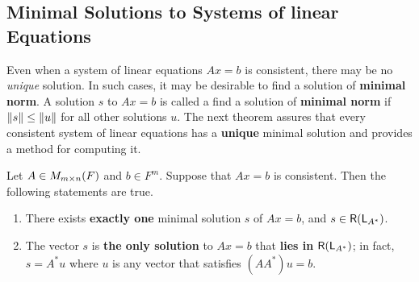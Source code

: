 \subsection{Minimal Solutions to Systems of linear Equations} \label{sec 6.3.2}

Even when a system of linear equations \(Ax = b\) is consistent, there may be no \emph{unique} solution.
In such cases, it may be desirable to find a solution of \textbf{minimal norm}.
A solution \(s\) to \(Ax = b\) is called a find a solution of \textbf{minimal norm} if \(\left\lVert s\right\rVert \le \left\lVert u\right\rVert\) for all other solutions \(u\).
The next theorem assures that every consistent system of linear equations has a \textbf{unique} minimal solution and provides a method for computing it.

\begin{theorem} \label{thm 6.13}
Let \(A \in M_{m \times n}(F)\) and \(b \in F^m\).
Suppose that \(Ax = b\) is consistent.
Then the following statements are true.
\begin{enumerate}
\item There exists \textbf{exactly one} minimal solution \(s\) of \(Ax = b\), and \(s \in \textsf{R}(\textsf{L}_{A^*})\).
\item The vector \(s\) is \textbf{the only solution} to \(Ax = b\) that \textbf{lies in} \(\textsf{R}(\textsf{L}_{A^*})\);
in fact, \(s = A^*u\) where \(u\) is any vector that satisfies \((AA^*)u = b\).
\end{enumerate}
\end{theorem}

